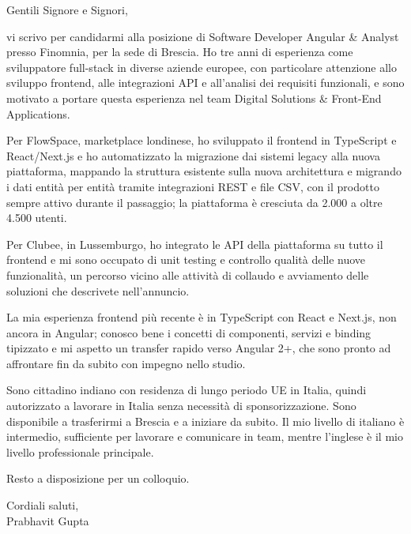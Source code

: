 \documentclass[a4paper,11pt]{article}
\begin{document}
Gentili Signore e Signori,

vi scrivo per candidarmi alla posizione di Software Developer Angular \& Analyst presso Finomnia, per la sede di Brescia. Ho tre anni di esperienza come sviluppatore full-stack in diverse aziende europee, con particolare attenzione allo sviluppo frontend, alle integrazioni API e all'analisi dei requisiti funzionali, e sono motivato a portare questa esperienza nel team Digital Solutions \& Front-End Applications.

Per FlowSpace, marketplace londinese, ho sviluppato il frontend in TypeScript e React/Next.js e ho automatizzato la migrazione dai sistemi legacy alla nuova piattaforma, mappando la struttura esistente sulla nuova architettura e migrando i dati entità per entità tramite integrazioni REST e file CSV, con il prodotto sempre attivo durante il passaggio; la piattaforma è cresciuta da 2.000 a oltre 4.500 utenti.

Per Clubee, in Lussemburgo, ho integrato le API della piattaforma su tutto il frontend e mi sono occupato di unit testing e controllo qualità delle nuove funzionalità, un percorso vicino alle attività di collaudo e avviamento delle soluzioni che descrivete nell'annuncio.

La mia esperienza frontend più recente è in TypeScript con React e Next.js, non ancora in Angular; conosco bene i concetti di componenti, servizi e binding tipizzato e mi aspetto un transfer rapido verso Angular 2+, che sono pronto ad affrontare fin da subito con impegno nello studio.

Sono cittadino indiano con residenza di lungo periodo UE in Italia, quindi autorizzato a lavorare in Italia senza necessità di sponsorizzazione. Sono disponibile a trasferirmi a Brescia e a iniziare da subito. Il mio livello di italiano è intermedio, sufficiente per lavorare e comunicare in team, mentre l'inglese è il mio livello professionale principale.

Resto a disposizione per un colloquio.

Cordiali saluti,\\
Prabhavit Gupta
\end{document}

